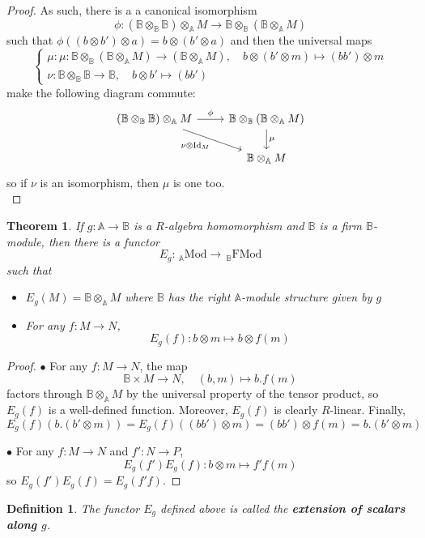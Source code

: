 \documentclass[a4paper,fleqn]{cas-sc}
\newtheorem{thm}{Theorem}%
\newtheorem{dfnt}{Definition}%
\newcommand{\bA}{\mathbb{A}}
\newcommand{\bB}{\mathbb{B}}
\newcommand{\qmod}{\mathrm{Mod}}
\newcommand{\fmod}{\mathrm{FMod}}
\begin{document}
\begin{proof}
As such, there is a a canonical isomorphism 
\[
\phi : (\bB \otimes_\bB \bB) \otimes_\bA M 
\to \bB \otimes_\bB (\bB \otimes_\bA M) 
\]
such that 
$\phi ((b \otimes b') \otimes a )
= b \otimes (b' \otimes a)$
and then the universal maps
\[
\begin{cases}
\mu : \mu : \bB \otimes_\bB (\bB \otimes_\bA M)  \to (\bB \otimes_\bA M),
\quad
b \otimes (b' \otimes m) \mapsto (bb') \otimes m
\\
\nu :
\bB \otimes_\bB \bB  \to \bB,
\quad
b \otimes b' \mapsto (bb')
\end{cases}
\]
make the following diagram commute:
\[\begin{tikzcd}
	{(\bB \otimes_\bB \bB) \otimes_\bA M} & {\bB \otimes_\bB (\bB \otimes_\bA M)} \\
	& {\bB \otimes_\bA M}
	\arrow["\phi", from=1-1, to=1-2]
	\arrow["{\nu \otimes \mathrm{Id}_M}"', from=1-1, to=2-2]
	\arrow["\mu", from=1-2, to=2-2]
\end{tikzcd}\]
so if $\nu$ is an isomorphism, then $\mu$ is one too.\\
\end{proof}

\begin{thm}
If $g : \bA \to \bB$ is a $R$-algebra homomorphism and $\bB$ is a firm $\bB$-module, then there is a functor 
\[E_g : \,_\bA \qmod \to \,_\bB \fmod\]
such that 
\begin{itemize}
    \item $E_g(M) = \bB \otimes_\bA M$ where $\bB$ has the right $\bA$-module structure given by $g$
    \item For any $f : M \to N$, 
    \[
    E_g(f) : b \otimes m \mapsto b \otimes f(m)
    \]
\end{itemize}
\end{thm}


\begin{proof}
$\bullet$ For any $f : M \to N$, the map
\[\bB \times M \to N, 
\quad
(b, m) \mapsto b.f(m)\]
factors through $\bB \otimes_\bA M$ by the universal property of the tensor product, so $E_g(f)$ is a well-defined function. Moreover, $E_g(f)$ is clearly $R$-linear. Finally,
\[
E_g(f) (b. (b' \otimes m)) 
= E_g(f) ((bb') \otimes m)
=(bb') \otimes f(m) = b. (b' \otimes m)
\]

$\bullet$ For any $f : M \to N$ and $f' : N \to P$,
\[
E_g(f')E_g(f): b \otimes m \mapsto f'f(m)
\]
so $E_g(f')E_g(f) = E_g(f'f)$.
\end{proof}

\begin{dfnt}
The functor $E_g$ defined above is called the \textbf{extension of scalars along $g$}. 
\end{dfnt}
\end{document}
